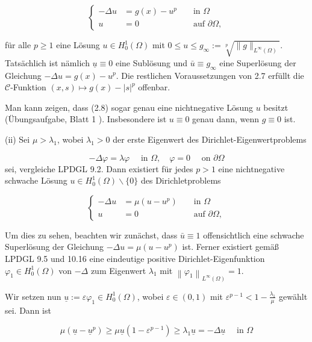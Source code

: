 \documentclass[10pt, letterpaper]{article}
\begin{document}
$$
\left\{\begin{aligned}
-\Delta u & =g(x)-u^{p} & & \text { in } \Omega \\
u & =0 & & \text { auf } \partial \Omega,
\end{aligned}\right.
$$

für alle $p \geq 1$ eine Lösung $u \in H_{0}^{1}(\Omega)$ mit $0 \leq u \leq g_{\infty}:=\sqrt[p]{\|g\|_{L^{\infty}(\Omega)}}$. Tatsächlich ist nämlich $\underline{u} \equiv 0$ eine Sublösung und $\bar{u} \equiv g_{\infty}$ eine Superlösung der Gleichung $-\Delta u=g(x)-u^{p}$. Die restlichen Voraussetzungen von 2.7 erfüllt die $\mathcal{C}$-Funktion $(x, s) \mapsto g(x)-|s|^{p}$ offenbar.

Man kann zeigen, dass (2.8) sogar genau eine nichtnegative Lösung $u$ besitzt (Übungsaufgabe, Blatt 1 ). Insbesondere ist $u \equiv 0$ genau dann, wenn $g \equiv 0$ ist.

(ii) Sei $\mu>\lambda_{1}$, wobei $\lambda_{1}>0$ der erste Eigenwert des Dirichlet-Eigenwertproblems

$$
-\Delta \varphi=\lambda \varphi \quad \text { in } \Omega, \quad \varphi=0 \quad \text { on } \partial \Omega
$$
sei, vergleiche LPDGL 9.2. Dann existiert für jedes $p>1$ eine nichtnegative schwache Lösung $u \in H_{0}^{1}(\Omega) \backslash\{0\}$ des Dirichletproblems

$$
\left\{\begin{aligned}
-\Delta u & =\mu\left(u-u^{p}\right) & & \text { in } \Omega \\
u & =0 & & \text { auf } \partial \Omega,
\end{aligned}\right.
$$

Um dies zu sehen, beachten wir zunächst, dass $\bar{u} \equiv 1$ offensichtlich eine schwache Superlösung der Gleichung $-\Delta u=\mu\left(u-u^{p}\right)$ ist. Ferner existiert gemäß LPDGL 9.5 und 10.16 eine eindeutige positive Dirichlet-Eigenfunktion $\varphi_{1} \in H_{0}^{1}(\Omega)$ von $-\Delta$ zum Eigenwert $\lambda_{1}$ mit $\left\|\varphi_{1}\right\|_{L^{\infty}(\Omega)}=1$.

Wir setzen nun $\underline{u}:=\varepsilon \varphi_{1} \in H_{0}^{1}(\Omega)$, wobei $\varepsilon \in(0,1)$ mit $\varepsilon^{p-1}<1-\frac{\lambda_{1}}{\mu}$ gewählt sei. Dann ist

$$
\mu\left(\underline{u}-\underline{u}^{p}\right) \geq \mu \underline{u}\left(1-\varepsilon^{p-1}\right) \geq \lambda_{1} \underline{u}=-\Delta \underline{u} \quad \text { in } \Omega
$$
\end{document}
